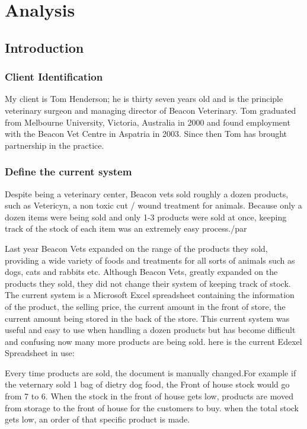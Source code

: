 \chapter{Analysis}

\section{Introduction}

\subsection{Client Identification}

	\begin{flushleft}

My client is Tom Henderson; he is thirty seven years old and is the principle veterinary surgeon and managing director of Beacon Veterinary. Tom graduated from Melbourne University, Victoria, Australia in 2000 and found employment with the Beacon Vet Centre in Aspatria in 2003. Since then Tom has brought partnership in the practice. \par


	\end{flushleft}

\subsection{Define the current system}

	\begin{flushleft}
Despite being a veterinary center, Beacon vets sold roughly a dozen products, such as Vetericyn, a non toxic cut / wound treatment for animals. Because only a dozen items were being sold and only 1-3 products were sold at once, keeping track of the stock of each item was an extremely easy process./par

Last year Beacon Vets expanded on the range of the products they sold, providing a wide variety of foods and treatments for all sorts of animals such as dogs, cats and rabbits etc. Although Beacon Vets, greatly expanded on the products they sold, they did not change their system of keeping track of stock. The current system is a Microsoft Excel spreadsheet containing the information of the product, the selling price, the current amount in the front of store, the current amount being stored in the back of the store. This current system was useful and easy to use when handling a dozen products but has become difficult and confusing now many more products are being sold. here is the current Edexel Spreadsheet in use:\par

Every time products are sold, the document is manually changed.For example if the veternary sold 1 bag of dietry dog food, the Front of house stock would go from 7 to 6. When the stock in the front of house gets low, products are moved from storage to the front of house for the customers to buy. when the total stock gets low, an order of that specific product is made.\par
	\end{flushleft}

